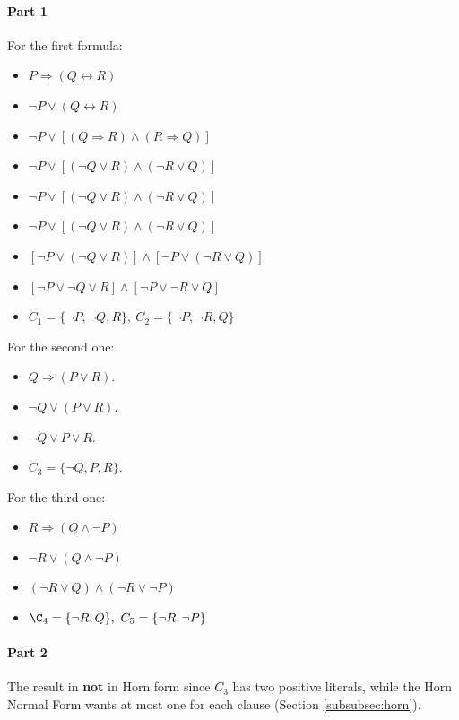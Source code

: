 \documentclass[10pt,a4paper]{article}
\begin{document}
\paragraph{Part 1}

For the first formula:
\begin{itemize}
\item $P \Rightarrow (Q \leftrightarrow R)$
\item $\neg P \vee (Q \leftrightarrow R)$
\item $\neg P \vee [(Q \Rightarrow R) \wedge (R \Rightarrow Q)]$
\item $\neg P \vee [(\neg Q \vee R) \wedge (\neg R \vee Q)]$
\item $\neg P \vee [(\neg Q \vee R) \wedge (\neg R \vee Q)]$
\item $\neg P \vee [(\neg Q \vee R) \wedge (\neg R \vee Q)]$
\item $[\neg P \vee (\neg Q \vee R)] \wedge [\neg P \vee  (\neg R \vee Q)]$
\item $[\neg P \vee \neg Q \vee R] \wedge [\neg P \vee  \neg R \vee Q]$
\item $C_1=\lbrace \neg P, \neg Q , R\rbrace,\ C_2=\lbrace \neg P,  \neg R, Q\rbrace$
\end{itemize}

For the second one:
\begin{itemize}
\item $Q \Rightarrow (P \vee R)$.
\item $\neg Q \vee (P \vee R)$.
\item $\neg Q \vee P \vee R$.
\item $C_3= \lbrace \neg Q, P, R\rbrace$.
\end{itemize}

For the third one:
\begin{itemize}
\item $R \Rightarrow (Q \wedge \neg P)$
\item $\neg R \vee (Q \wedge \neg P)$
\item $(\neg R \vee Q) \wedge( \neg R \vee \neg P)$
\item $\C_4= \lbrace \neg R, Q\rbrace,\ C_5=\lbrace \neg R , \neg P\rbrace$

\end{itemize}

\paragraph{Part 2}
The result in \textbf{not} in Horn form since $C_3$ has two positive literals, while the Horn Normal Form wants at most one for each clause (Section \ref{subsubsec:horn}).
\end{document}
